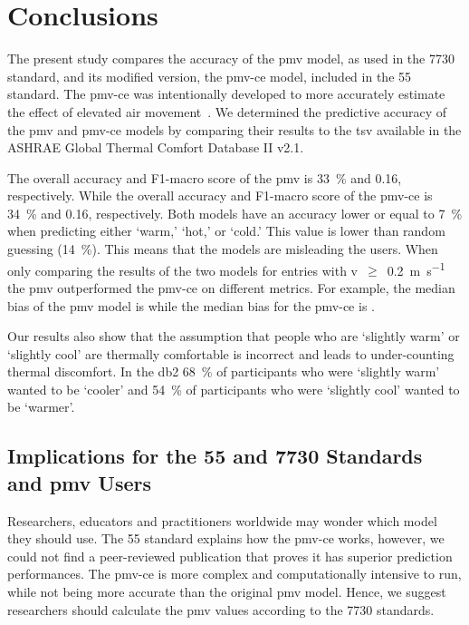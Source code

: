 \section{Conclusions}\label{sec:conclusions}
The present study compares the accuracy of the \ac{pmv} model, as used in the \gls{7730} standard, and its modified version, the \ac{pmv-ce} model, included in the \gls{55} standard.
The \ac{pmv-ce} was intentionally developed to more accurately estimate the effect of elevated air movement~\cite{arens_moving_2009}.
We determined the predictive accuracy of the \ac{pmv} and \ac{pmv-ce} models by comparing their results to the \ac{tsv} available in the ASHRAE Global Thermal Comfort Database II v2.1.

The overall accuracy and F1-macro score of the \ac{pmv} is \qty{33}{\percent} and \num{.16}, respectively.
While the overall accuracy and F1-macro score of the \ac{pmv-ce} is \qty{34}{\percent} and \num{.16}, respectively.
Both models have an accuracy lower or equal to \qty{7}{\percent} when predicting either `warm,' `hot,' or `cold.'
This value is lower than random guessing (\qty{14}{\percent}).
This means that the models are misleading the users.
When only comparing the results of the two models for entries with \ac{v}~$\geq$~\qty{0.2}{\m\per\s} the \ac{pmv} outperformed the \ac{pmv-ce} on different metrics.
For example, the median bias of the \ac{pmv} model is  while the median bias for the \ac{pmv-ce} is .

Our results also show that the assumption that people who are `slightly warm' or `slightly cool' are thermally comfortable is incorrect and leads to under-counting thermal discomfort.
In the \ac{db2} \qty{68}{\percent} of participants who were `slightly warm' wanted to be `cooler' and \qty{54}{\percent} of participants who were `slightly cool' wanted to be `warmer'.

\subsection{Implications for the \gls{55} and \gls{7730} Standards and \ac{pmv} Users}\label{subsec:implications-for-the-ashrae-55-and-iso-7730-standards}
Researchers, educators and practitioners worldwide may wonder which model they should use.
The \gls{55} standard explains how the \ac{pmv-ce} works, however, we could not find a peer-reviewed publication that proves it has superior prediction performances.
The \ac{pmv-ce} is more complex and computationally intensive to run, while not being more accurate than the original \ac{pmv} model.
Hence, we suggest researchers should calculate the \ac{pmv} values according to the \gls{7730} standards.

